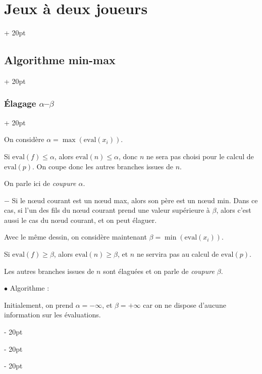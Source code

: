 \documentclass[a4paper, 12pt, twoside]{article}
\renewcommand{\le}{\leqslant}
\renewcommand{\ge}{\geqslant}
\newcommand{\ind}[1][20pt]{\advance\leftskip + #1}
\newcommand{\deind}[1][20pt]{\advance\leftskip - #1}
\newenvironment{indt}[2][20pt]{#2 \par \ind[#1]}{\par \deind} %
\begin{document}
\begin{indt}{\section{Jeux à deux joueurs}}
\begin{indt}{\subsection{Algorithme min-max}}
\begin{indt}{\subsubsection{\'Elagage $\alpha$--$\beta$}}
                \begin{center}
                \end{center}

                On considère $\alpha = \max(\mathrm{eval}(x_i))$.

                Si $\mathrm{eval}(f) \le \alpha$, alors $\mathrm{eval}(n) \le \alpha$, donc $n$ ne sera pas choisi pour le calcul de $\mathrm{eval}(p)$.
                On coupe donc les autres branches issues de $n$.

                On parle ici de \emph{coupure $\alpha$}.

                \vspace{6pt}
                
                $-$ Si le n\oe ud courant est un n\oe ud max, alors son père est un n\oe ud min.
                Dans ce cas, si l'un des fils du n\oe ud courant prend une valeur supérieure à $\beta$, alors c'est aussi le cas du n\oe ud courant, et on peut élaguer.

                Avec le même dessin, on considère maintenant $\beta = \min(\mathrm{eval}(x_i))$.

                Si $\mathrm{eval}(f) \ge \beta$, alors $\mathrm{eval}(n) \ge \beta$, et $n$ ne servira pas au calcul de $\mathrm{eval}(p)$.

                Les autres branches issues de $n$ sont élaguées et on parle de \emph{coupure $\beta$}.

                \vspace{12pt}
                
                $\bullet$ Algorithme :

                Initialement, on prend $\alpha = -\infty$, et $\beta = +\infty$ car on ne dispose d'aucune information sur les évaluations.


\end{indt}
\end{indt}
\end{indt}
\end{document}
